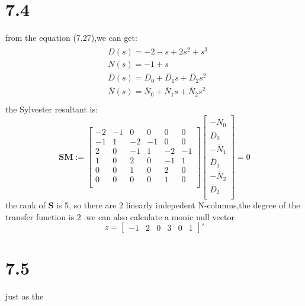 \documentclass{article}
\begin{document}
\section*{7.4}
from the equation (7.27),we can get:
\[
\begin{aligned}
\begin{split}
&D(s)=-2-s+2s^2+s^3\\
&N(s)=-1+s\\
&\overline{D}(s)=\overline{D}_0+\overline{D}_1s+\overline{D}_2s^2\\
&\overline{N}(s)=\overline{N}_0+\overline{N}_1s+\overline{N}_2s^2\\
\end{split}
\end{aligned}
\]
the Sylvester resultant is:
\[
\textbf{SM}:=
\left[
\begin{array}{cccccc}
-2 &-1 & 0  & 0 & 0 & 0\\
-1 &1  & -2 & -1& 0 & 0\\
2  &0  & -1 & 1 & -2& -1\\
1  &0  & 2  & 0 & -1& 1\\
0  &0  & 1  & 0 & 2 & 0\\
0  &0  & 0  & 0 & 1 & 0\\
\end{array}
\right]
\left[
    \begin{array}{c}
    -\overline{N}_0\\
    \overline{D}_0\\
    -\overline{N}_1\\
    \overline{D}_1\\
    -\overline{N}_2\\
    \overline{D}_2\\
    \end{array}
\right]=0
\] 
the rank of \textbf{S} is 5, so  there are 2 linearly indepedent N-columns,the degree of the transfer function is 2 .we can also calculate a monic null vector 
\[
z=\left[
    \begin{array}{cccccc}
        -1 & 2 & 0 & 3 & 0 & 1
    \end{array}
\right]'   
\]
\section*{7.5}
just as the 
\end{document}
